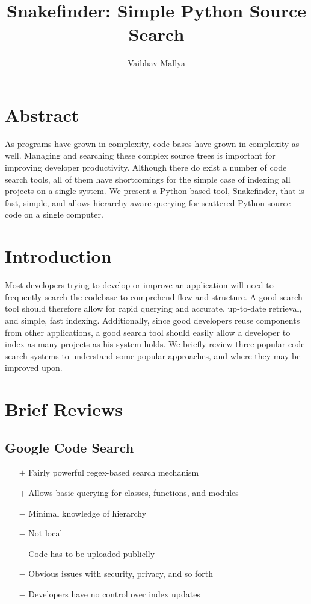\documentclass{article}
\begin{document}
\title{Snakefinder: Simple Python Source Search}
\author{Vaibhav Mallya}
\maketitle

\section{Abstract}

As programs have grown in complexity, code bases have grown in complexity as well. Managing and searching these complex source trees is important for improving developer productivity. Although there do exist a number of code search tools, all of them have shortcomings for the simple case of indexing all projects on a single system. We present a Python-based tool, Snakefinder, that is fast, simple, and allows hierarchy-aware querying for scattered Python source code on a single computer.

\section{Introduction}
Most developers trying to develop or improve an application will need to frequently search the codebase to comprehend flow and structure. A good search tool should therefore allow for rapid querying and accurate, up-to-date retrieval, and simple, fast indexing. Additionally, since good developers reuse components from other applications, a good search tool should easily allow a developer to index as many projects as his system holds. We briefly review three popular code search systems to understand some popular approaches, and where they may be improved upon.


\section{Brief Reviews}
\subsection{Google Code Search}
	\begin{itemize}
    \item[$+$] Fairly powerful regex-based search mechanism
    \item[$+$] Allows basic querying for classes, functions, and modules

    \item[$-$] Minimal knowledge of hierarchy    
	\item[$-$] Not local  
    \item[$-$] Code has to be uploaded publiclly
    \item[$-$] Obvious issues with security, privacy, and so forth
    \item[$-$] Developers have no control over index updates
	\end{itemize}
	
\end{document}
